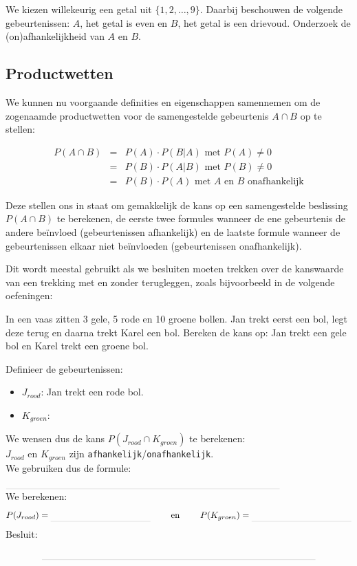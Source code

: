 \documentclass[12pt,twoside]{article}
\begin{document}
\begin{oefening}
We kiezen willekeurig een getal uit $\{1,2,\ldots, 9\}$. Daarbij beschouwen de volgende gebeurtenissen: $A$, het getal is even en $B$, het getal is een drievoud. Onderzoek de (on)afhankelijkheid van $A$ en $B$.
\end{oefening}

\subsection{Productwetten}

We kunnen nu voorgaande definities en eigenschappen samennemen om de zogenaamde productwetten voor de samengestelde gebeurtenis $A\cap B$ op te stellen:\\

\begin{mdframed}\vspace*{-0.5cm}
\begin{eqnarray*}
  P(A\cap B) &=& P(A)\cdot P(B|A) \mbox{ met } P(A)\neq 0\\
             &=& P(B)\cdot P(A|B) \mbox{ met } P(B)\neq 0\\
             &=& P(B)\cdot P(A) \mbox{ met $A$ en $B$ onafhankelijk}
\end{eqnarray*}
\end{mdframed}

Deze stellen ons in staat om gemakkelijk de kans op een samengestelde beslissing $P(A\cap B)$ te berekenen, de eerste twee formules wanneer de ene gebeurtenis de andere beïnvloed (gebeurtenissen afhankelijk) en de laatste formule wanneer de gebeurtenissen elkaar niet beïnvloeden (gebeurtenissen onafhankelijk).

Dit wordt meestal gebruikt als we besluiten moeten trekken over de kanswaarde van een trekking met en zonder terugleggen, zoals bijvoorbeeld in de volgende oefeningen:

\begin{oefening}
In een vaas zitten 3 gele, 5 rode en 10 groene bollen. Jan trekt eerst een bol, legt deze terug en daarna trekt Karel een bol. Bereken de kans op: Jan trekt een gele bol en Karel trekt een groene bol.

Definieer de gebeurtenissen:
\begin{itemize}
  \itemsep0.1em
  \item $J_{rood}$: Jan trekt een rode bol.
  \item $K_{groen}$: \arulefill
\end{itemize}
\vspace*{0.5cm}
We wensen dus de kans $P(J_{rood}\cap K_{groen})$ te berekenen:\\
$J_{rood}$ en $K_{groen}$ zijn \verb#afhankelijk#/\verb#onafhankelijk#.\\
We gebruiken dus de formule:
$\arule{10cm}$\\
We berekenen:
$$P(J_{rood})=\arule{4cm} \qquad\mbox{ en }\qquad P(K_{groen})=\arule{4cm}$$
Besluit:
$$\arule{10cm}$$
\end{oefening}
\end{document}
